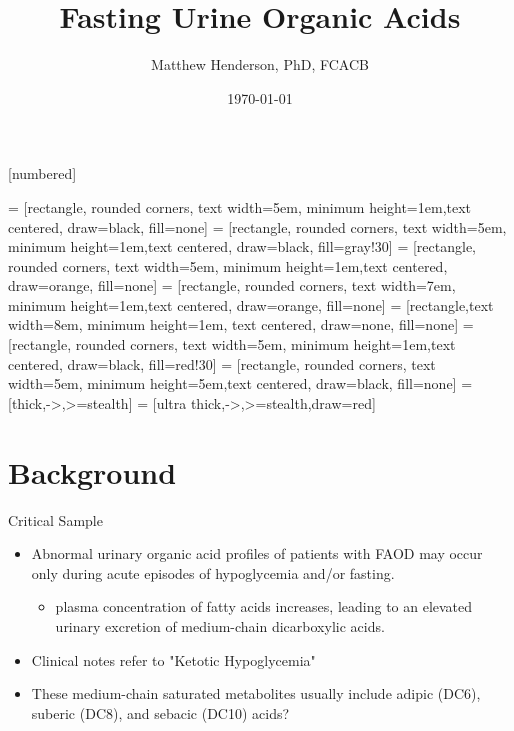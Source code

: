 \documentclass[presentation, smaller]{beamer}
\author{Matthew Henderson, PhD, FCACB}
\date{\today}
\title{Fasting Urine Organic Acids}
\institute[NSO]{Newborn Screening Ontario}
\begin{document}
\maketitle


\vspace{220pt}
\beamertemplatenavigationsymbolsempty
{}[numbered]


 = [rectangle, rounded corners, text width=5em, minimum height=1em,text centered, draw=black, fill=none]
 = [rectangle, rounded corners, text width=5em, minimum height=1em,text centered, draw=black, fill=gray!30]
 = [rectangle, rounded corners, text width=5em, minimum height=1em,text centered, draw=orange, fill=none]
 = [rectangle, rounded corners, text width=7em, minimum height=1em,text centered, draw=orange, fill=none]
 = [rectangle,text width=8em, minimum height=1em, text centered, draw=none, fill=none]
 = [rectangle, rounded corners, text width=5em, minimum height=1em,text centered, draw=black, fill=red!30]
 = [rectangle, rounded corners, text width=5em, minimum height=5em,text centered, draw=black, fill=none]
 = [thick,->,>=stealth]
 = [ultra thick,->,>=stealth,draw=red]

\section{Background}
\label{sec:orgheadline13}
\begin{frame}[label={sec:orgheadline1}]{Critical Sample}
\begin{itemize}
\item Abnormal urinary organic acid profiles of patients with FAOD may
occur only during acute episodes of hypoglycemia and/or fasting.

\begin{itemize}
\item plasma concentration of fatty acids increases, leading to an
elevated urinary excretion of medium-chain dicarboxylic acids.
\end{itemize}

\item Clinical notes refer to "Ketotic Hypoglycemia"

\item These medium-chain saturated metabolites usually include adipic
(DC6), suberic (DC8), and sebacic (DC10) acids?
\end{itemize}
\end{frame}
\end{document}

